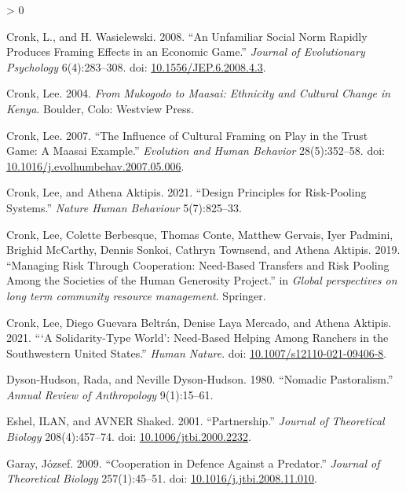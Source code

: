 \documentclass[
]{article}
\newlength{\cslhangindent}
\newenvironment{CSLReferences}[2] %
 {%
  \setlength{\parindent}{0pt}
  \ifodd #1 \everypar{\setlength{\hangindent}{\cslhangindent}}\ignorespaces\fi
  \ifnum #2 > 0
  \setlength{\parskip}{#2\baselineskip}
  \fi
 }%
 {}
\begin{document}
\begin{CSLReferences}{1}{0}
\leavevmode\hypertarget{ref-cronkUnfamiliarSocialNorm2008}{}%
Cronk, L., and H. Wasielewski. 2008. {``An Unfamiliar Social Norm Rapidly Produces Framing Effects in an Economic Game.''} \emph{Journal of Evolutionary Psychology} 6(4):283--308. doi: \href{https://doi.org/10.1556/JEP.6.2008.4.3}{10.1556/JEP.6.2008.4.3}.

\leavevmode\hypertarget{ref-cronkMukogodoMaasaiEthnicity2004}{}%
Cronk, Lee. 2004. \emph{From {Mukogodo} to {Maasai}: Ethnicity and Cultural Change in {Kenya}}. {Boulder, Colo}: {Westview Press}.

\leavevmode\hypertarget{ref-cronkInfluenceCulturalFraming2007}{}%
Cronk, Lee. 2007. {``The Influence of Cultural Framing on Play in the Trust Game: A {Maasai} Example.''} \emph{Evolution and Human Behavior} 28(5):352--58. doi: \href{https://doi.org/10.1016/j.evolhumbehav.2007.05.006}{10.1016/j.evolhumbehav.2007.05.006}.

\leavevmode\hypertarget{ref-cronk2021design}{}%
Cronk, Lee, and Athena Aktipis. 2021. {``Design Principles for Risk-Pooling Systems.''} \emph{Nature Human Behaviour} 5(7):825--33.

\leavevmode\hypertarget{ref-cronkManagingRiskCooperationinpress}{}%
Cronk, Lee, Colette Berbesque, Thomas Conte, Matthew Gervais, Iyer Padmini, Brighid McCarthy, Dennis Sonkoi, Cathryn Townsend, and Athena Aktipis. 2019. {``Managing Risk Through Cooperation: {Need}-Based Transfers and Risk Pooling Among the Societies of the {Human Generosity Project}.''} in \emph{Global perspectives on long term community resource management}. {Springer}.

\leavevmode\hypertarget{ref-cronkSolidarityTypeWorldNeedBased2021}{}%
Cronk, Lee, Diego Guevara Beltrán, Denise Laya Mercado, and Athena Aktipis. 2021. {``{`{A Solidarity}-{Type World}'}: {Need}-{Based Helping} Among {Ranchers} in the {Southwestern United States}.''} \emph{Human Nature}. doi: \href{https://doi.org/10.1007/s12110-021-09406-8}{10.1007/s12110-021-09406-8}.

\leavevmode\hypertarget{ref-dyson-hudsonNomadicPastoralism1980}{}%
Dyson-Hudson, Rada, and Neville Dyson-Hudson. 1980. {``Nomadic Pastoralism.''} \emph{Annual Review of Anthropology} 9(1):15--61.

\leavevmode\hypertarget{ref-eshelPartnership2001}{}%
Eshel, ILAN, and AVNER Shaked. 2001. {``Partnership.''} \emph{Journal of Theoretical Biology} 208(4):457--74. doi: \href{https://doi.org/10.1006/jtbi.2000.2232}{10.1006/jtbi.2000.2232}.

\leavevmode\hypertarget{ref-garayCooperationDefencePredator2009}{}%
Garay, József. 2009. {``Cooperation in Defence Against a Predator.''} \emph{Journal of Theoretical Biology} 257(1):45--51. doi: \href{https://doi.org/10.1016/j.jtbi.2008.11.010}{10.1016/j.jtbi.2008.11.010}.


\end{CSLReferences}
\end{document}
